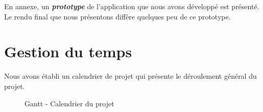  En annexe, un \textbf{\textit{prototype}} de l'application que nous avons développé est présenté. Le rendu final que nous présentons diffère quelques peu de ce prototype.

\section{Gestion du temps}

Nous avons établi un calendrier de projet qui présente le déroulement général du projet.

\begin{figure}[!ht]
 \begin{center}
   \caption{\label{gantt} Gantt - Calendrier du projet}
 \end{center}  
\end{figure}
